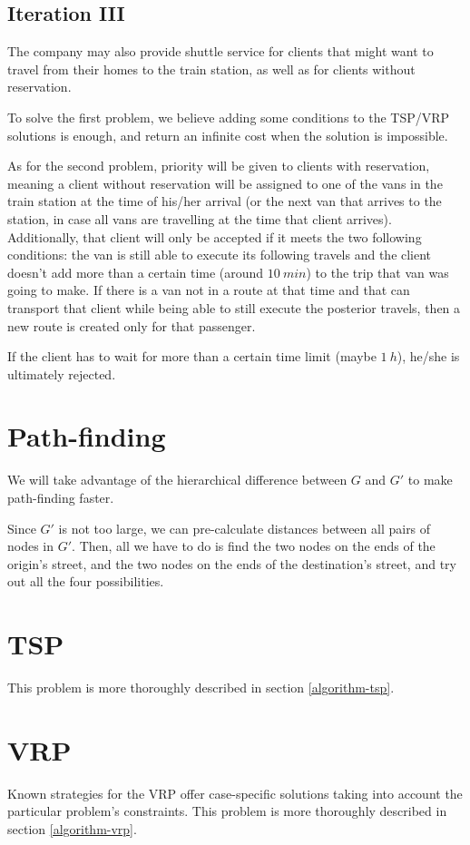 \subsection{Iteration III}
The company may also provide shuttle service for clients that might want to travel from their homes to the train station, as well as for clients without reservation.\par
To solve the first problem, we believe adding some conditions to the TSP/VRP solutions is enough, and return an infinite cost when the solution is impossible.\par
As for the second problem, priority will be given to clients with reservation, meaning a client without reservation will be assigned to one of the vans in the train station at the time of his/her arrival (or the next van that arrives to the station, in case all vans are travelling at the time that client arrives). Additionally, that client will only be accepted if it meets the two following conditions: the van is still able to execute its following travels and the client doesn't add more than a certain time (around $\SI{10}{min}$) to the trip that van was going to make. If there is a van not in a route at that time and that can transport that client while being able to still execute the posterior travels, then a new route is created only for that passenger.\par
If the client has to wait for more than a certain time limit (maybe $\SI{1}{h}$), he/she is ultimately rejected.
\section{Path-finding} \label{problem-decomposition-pathfinding}
We will take advantage of the hierarchical difference between $G$ and $G'$ to make path-finding faster.\par
Since $G'$ is not too large, we can pre-calculate distances between all pairs of nodes in $G'$.
Then, all we have to do is find the two nodes on the ends of the origin's street, and the two nodes on the ends of the destination's street, and try out all the four possibilities.
\section{\texorpdfstring{\Acrlong*{TSP}}{Travelling salesman problem}} \label{problem-decomposition-tsp}
This problem is more thoroughly described in section \ref{algorithm-tsp}.
\section{\texorpdfstring{\Acrlong*{VRP}}{Vehicle routing problem}} \label{problem-decomposition-vrp}
Known strategies for the \acrshort{VRP} offer case-specific solutions taking into account the particular problem's constraints. This problem is more thoroughly described in section \ref{algorithm-vrp}.
